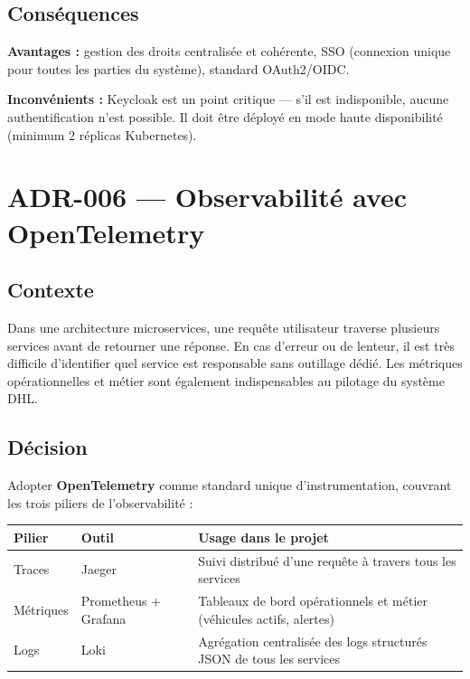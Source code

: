 \documentclass[10pt,a4paper]{article}
\begin{document}
\subsection{Conséquences}
\textbf{Avantages :} gestion des droits centralisée et cohérente, SSO (connexion unique pour toutes les parties du système), standard OAuth2/OIDC.

\noindent\textbf{Inconvénients :} Keycloak est un point critique --- s'il est indisponible, aucune authentification n'est possible. Il doit être déployé en mode haute disponibilité (minimum 2 réplicas Kubernetes).

\section{ADR-006 --- Observabilité avec OpenTelemetry}

\subsection{Contexte}
Dans une architecture microservices, une requête utilisateur traverse plusieurs services avant de retourner une réponse. En cas d'erreur ou de lenteur, il est très difficile d'identifier quel service est responsable sans outillage dédié. Les métriques opérationnelles et métier sont également indispensables au pilotage du système DHL.

\subsection{Décision}
Adopter \textbf{OpenTelemetry} comme standard unique d'instrumentation, couvrant les trois piliers de l'observabilité :

\vspace{4pt}
\begin{tabularx}{\linewidth}{llX}
  \toprule
  \small\textbf{Pilier} & \small\textbf{Outil} & \small\textbf{Usage dans le projet} \\
  \midrule
  Traces    & Jaeger              & Suivi distribué d'une requête à travers tous les services \\
  Métriques & Prometheus + Grafana & Tableaux de bord opérationnels et métier (véhicules actifs, alertes) \\
  Logs      & Loki                & Agrégation centralisée des logs structurés JSON de tous les services \\
  \bottomrule
\end{tabularx}
\end{document}

